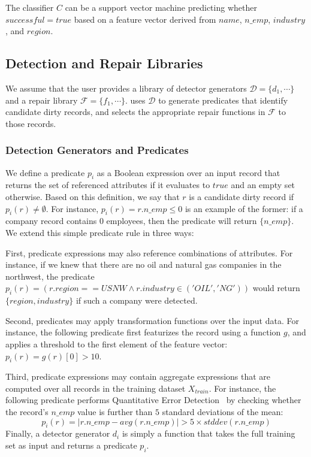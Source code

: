 \begin{example}[Classification]\sloppy
The classifier $C$ can be a support vector machine predicting whether $successful = true$ based on a feature vector derived from
$name$, $n\_emp$, $industry$, and $region$.
\end{example}

\subsection{Detection and Repair Libraries}
We assume that the user provides a library of detector generators $\mathcal{D} = \{d_1,\cdots\}$ and a repair library $\mathcal{F} = \{f_1,\cdots\}$.  \sys uses $\mathcal{D}$ to generate predicates that identify candidate dirty records, and selects the appropriate repair functions in $\mathcal{F}$ to those records.  

\subsubsection{Detection Generators and Predicates}
We define a predicate $p_i$ as a Boolean expression over an input record that returns the set of referenced attributes if it evaluates to $true$ and an empty set otherwise.  Based on this definition, we say that $r$ is a candidate dirty record if $p_i(r) \ne \emptyset$. For instance, $p_i(r) = r.n\_emp \le 0$ is an example of the former: if a company record contains $0$ employees, then the predicate will return $\{n\_emp\}$.  We extend this simple predicate rule in three ways: 

First, predicate expressions may also reference combinations of attributes.  For instance, if we knew that there are no oil and natural gas companies in the northwest, the predicate $p_i(r) =  (r.region == USNW \wedge r.industry \in ('OIL','NG'))$ would return $\{region, industry\}$ if such a company were detected.

Second, predicates may apply transformation functions over the input data.  For instance, the following predicate first featurizes the record using a function $g$, and applies a threshold to the first element of the feature vector: $p_i(r) = g(r)[0] > 10$.  

Third, predicate expressions may contain aggregate expressions that are computed over all records in the training dataset $X_{train}$.  For instance, the following predicate performs Quantitative Error Detection~\cite{hellerstein2008quantitative} by checking whether the record's $n\_emp$ value is further than $5$ standard deviations of the mean: 
$$p_i(r) = |r.n\_emp - avg(r.n\_emp)| > 5\times stddev(r.n\_emp)$$
Finally, a detector generator $d_i$ is simply a function that takes the full training set as input and returns a predicate $p_i$. 

